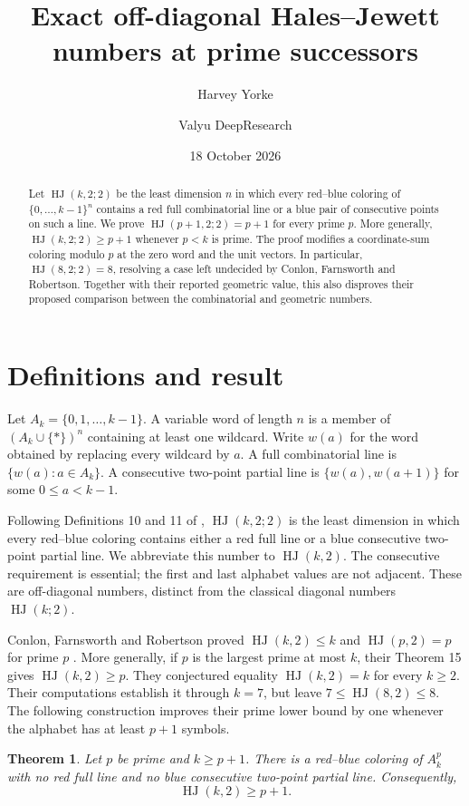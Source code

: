 \documentclass[11pt]{amsart}
\title[Off-diagonal Hales--Jewett numbers at prime successors]{Exact off-diagonal Hales--Jewett numbers at prime successors}
\author{Harvey Yorke}
\author{Valyu DeepResearch}
\date{18 October 2026}
\newtheorem{theorem}{Theorem}
\newcommand{\HJ}{\operatorname{HJ}}
\begin{document}
\begin{abstract}
Let $\HJ(k,2;2)$ be the least dimension $n$ in which every red--blue coloring of $\{0,\ldots,k-1\}^n$ contains a red full combinatorial line or a blue pair of consecutive points on such a line. We prove $\HJ(p+1,2;2)=p+1$ for every prime $p$. More generally, $\HJ(k,2;2)\ge p+1$ whenever $p<k$ is prime. The proof modifies a coordinate-sum coloring modulo $p$ at the zero word and the unit vectors. In particular, $\HJ(8,2;2)=8$, resolving a case left undecided by Conlon, Farnsworth and Robertson. Together with their reported geometric value, this also disproves their proposed comparison between the combinatorial and geometric numbers.
\end{abstract}
\maketitle

\section{Definitions and result}

Let $A_k=\{0,1,\ldots,k-1\}$. A variable word of length $n$ is a member of $(A_k\cup\{*\})^n$ containing at least one wildcard. Write $w(a)$ for the word obtained by replacing every wildcard by $a$. A full combinatorial line is $\{w(a):a\in A_k\}$. A consecutive two-point partial line is $\{w(a),w(a+1)\}$ for some $0\le a<k-1$.

Following Definitions 10 and 11 of \cite{CFR}, $\HJ(k,2;2)$ is the least dimension in which every red--blue coloring contains either a red full line or a blue consecutive two-point partial line. We abbreviate this number to $\HJ(k,2)$. The consecutive requirement is essential; the first and last alphabet values are not adjacent. These are off-diagonal numbers, distinct from the classical diagonal numbers $\HJ(k;2)$.

Conlon, Farnsworth and Robertson proved $\HJ(k,2)\le k$ and $\HJ(p,2)=p$ for prime $p$ \cite[Theorem 12 and Corollary 16]{CFR}. More generally, if $p$ is the largest prime at most $k$, their Theorem 15 gives $\HJ(k,2)\ge p$. They conjectured equality $\HJ(k,2)=k$ for every $k\ge2$. Their computations establish it through $k=7$, but leave $7\le\HJ(8,2)\le8$. The following construction improves their prime lower bound by one whenever the alphabet has at least $p+1$ symbols.

\begin{theorem}\label{thm:lower}
Let $p$ be prime and $k\ge p+1$. There is a red--blue coloring of $A_k^p$ with no red full line and no blue consecutive two-point partial line. Consequently,
\[
\HJ(k,2)\ge p+1.
\]
\end{theorem}
\end{document}
